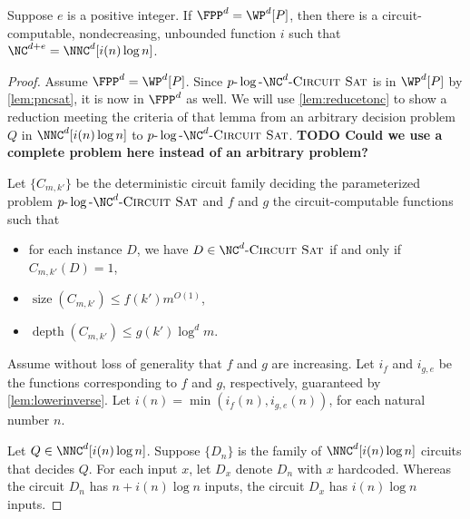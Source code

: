 \documentclass{article}
\newcommand{\todo}[1]{\textbf{TODO #1}}
\newcommand{\dash}{\textnormal{-}}
\newcommand{\pncsat}{p\dash\log\dash\NC^d\dash\textsc{Circuit Sat}}
\DeclareMathOperator{\depth}{depth}
\DeclareMathOperator{\size}{size}
\begin{document}
\begin{theorem}\label{thm:wpppartii}
  Suppose $e$ is a positive integer.
  If $\FPP^d = \WP^d[P]$, then there is a circuit-computable, nondecreasing, unbounded function $i$ such that $\NC^{d + e} = \NNC^d[i(n) \log n]$.
\end{theorem}
\begin{proof}
  Assume $\FPP^d = \WP^d[P]$.
  Since $\pncsat$ is in $\WP^d[P]$ by \autoref{lem:pncsat}, it is now in $\FPP^d$ as well.
  We will use \autoref{lem:reducetonc} to show a reduction meeting the criteria of that lemma from an arbitrary decision problem $Q$ in $\NNC^d[i(n) \log n]$ to $\pncsat$.
  \todo{Could we use a complete problem here instead of an arbitrary problem?}

  Let $\{C_{m, k'}\}$ be the deterministic circuit family deciding the parameterized problem $\pncsat$ and $f$ and $g$ the circuit-computable functions such that
  \begin{itemize}
  \item for each instance $D$, we have $D \in \NC^d\textnormal{-}\textsc{Circuit Sat}$ if and only if $C_{m, k'}(D) = 1$,
  \item $\size(C_{m, k'}) \leq f(k') m^{O(1)}$,
  \item $\depth(C_{m, k'}) \leq g(k') \log^d m$.
  \end{itemize}
  Assume without loss of generality that $f$ and $g$ are increasing.
  Let $i_f$ and $i_{g, e}$ be the functions corresponding to $f$ and $g$, respectively, guaranteed by \autoref{lem:lowerinverse}.
  Let $i(n) = \min(i_f(n), i_{g, e}(n))$, for each natural number $n$.

  Let $Q \in \NNC^d[i(n) \log n]$.
  Suppose $\{D_n\}$ is the family of $\NNC^d[i(n) \log n]$ circuits that decides $Q$.
  For each input $x$, let $D_x$ denote $D_n$ with $x$ hardcoded.
  Whereas the circuit $D_n$ has $n + i(n) \log n$ inputs, the circuit $D_x$ has $i(n) \log n$ inputs.


\end{proof}
\end{document}
